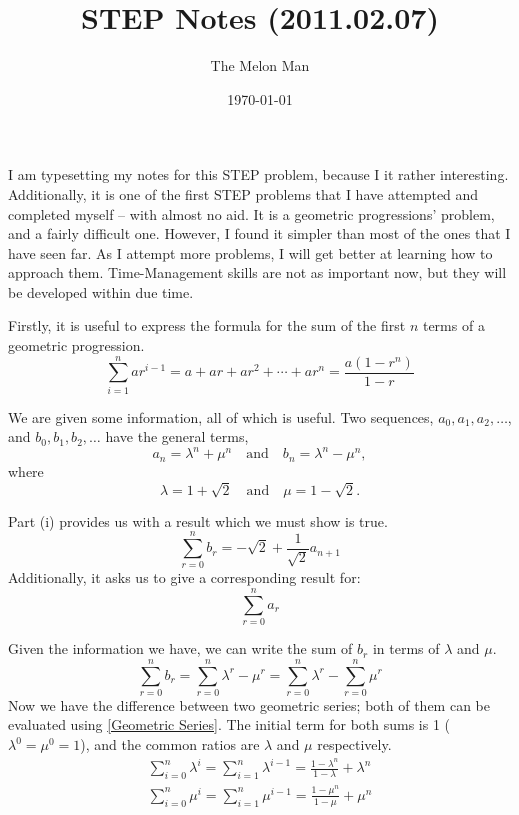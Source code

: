 \documentclass[12pt]{article}
\title{STEP Notes (2011.02.07)}
\author{The Melon Man}
\date{\today}
\begin{document}
\maketitle

I am typesetting my notes for this STEP problem, because I it rather interesting.
Additionally, it is one of the first STEP problems that I have attempted and completed myself -- with almost no aid.
It is a geometric progressions' problem, and a fairly difficult one.
However, I found it simpler than most of the ones that I have seen far.
As I attempt more problems, I will get better at learning how to approach them.
Time-Management skills are not as important now, but they will be developed within due time.

Firstly, it is useful to express the formula for the sum of the first $n$ terms of a geometric progression.
\begin{equation}
    \sum_{i=1}^n ar^{i-1} = a + ar + ar^2 + \cdots + ar^n = \frac{a(1-r^n)}{1-r} \label{Geometric Series}
\end{equation}

We are given some information, all of which is useful.
Two sequences, $a_0, a_1, a_2, \ldots$, and $b_0, b_1, b_2, \ldots$ have the general terms,
\begin{equation*}
    a_n = \lambda^n + \mu^n \quad \text{and} \quad b_n = \lambda^n - \mu^n,
\end{equation*}
where
\begin{equation*}
    \lambda = 1 + \sqrt{2} \quad \text{and} \quad \mu = 1 - \sqrt{2}.
\end{equation*}

Part (i) provides us with a result which we must show is true.
\begin{equation}
    \sum_{r=0}^{n} b_r = -\sqrt{2} + \frac{1}{\sqrt{2}} a_{n+1}
\end{equation}
Additionally, it asks us to give a corresponding result for:
\begin{equation*}
    \sum_{r=0}^{n} a_r
\end{equation*}

Given the information we have, we can write the sum of $b_r$ in terms of $\lambda$ and $\mu$.
\begin{equation*}
    \sum_{r=0}^{n} b_r = \sum_{r=0}^{n} \lambda^r - \mu^r = \sum_{r=0}^{n} \lambda^r - \sum_{r=0}^{n} \mu^r
\end{equation*}
Now we have the difference between two geometric series; both of them can be evaluated using \eqref{Geometric Series}.
The initial term for both sums is 1 ($\lambda^0=\mu^0=1$), and the common ratios are $\lambda$ and $\mu$ respectively.
\begin{align}
    \sum_{i=0}^{n} \lambda^i = \sum_{i=1}^{n} \lambda^{i-1} = \frac{1-\lambda^n}{1-\lambda} + \lambda^n \\
    \sum_{i=0}^{n} \mu^i = \sum_{i=1}^{n} \mu^{i-1} = \frac{1-\mu^n}{1-\mu} + \mu^n
\end{align}
\end{document}

